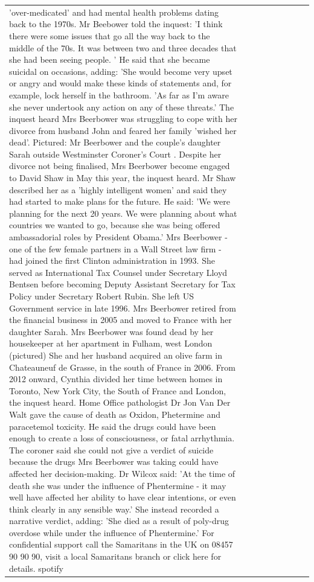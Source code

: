 \begin{table}[H]
\begin{tabular}{lllrlllll}
'over-medicated' and had mental health problems dating back to the 1970s. Mr Beebower told the inquest: 'I think there were some issues that go all the way back to the middle of the 70s. It was between two and three decades that she had been seeing people. ' He said that she became suicidal on occasions, adding: 'She would become very upset or angry and would make these kinds of statements and, for example, lock herself in the bathroom. 'As far as I'm aware she never undertook any action on any of these threats.' The inquest heard Mrs Beerbower was struggling to cope with her divorce from husband John and feared her family 'wished her dead'. Pictured: Mr Beerbower and the couple's daughter Sarah outside Westminster Coroner's Court . Despite her divorce not being finalised, Mrs Beerbower become engaged to David Shaw in May this year, the inquest heard. Mr Shaw described her as a 'highly intelligent women' and said they had started to make plans for the future. He said: 'We were planning for the next 20 years. We were planning about what countries we wanted to go, because she was being offered ambassadorial roles by President Obama.' Mrs Beerbower - one of the few female partners in a Wall Street law firm - had joined the first Clinton administration in 1993. She served as International Tax Counsel under Secretary Lloyd Bentsen before becoming Deputy Assistant Secretary for Tax Policy under Secretary Robert Rubin. She left US Government service in late 1996. Mrs Beerbower retired from the financial business in 2005 and moved to France with her daughter Sarah. Mrs Beerbower was found dead by her housekeeper at her apartment in Fulham, west London (pictured) She and her husband acquired an olive farm in Chateauneuf de Grasse, in the south of France in 2006. From 2012 onward, Cynthia divided her time between homes in Toronto, New York City, the South of France and London, the inquest heard. Home Office pathologist Dr Jon Van Der Walt gave the cause of death as Oxidon, Phetermine and paracetemol toxicity. He said the drugs could have been enough to create a loss of consciousness, or fatal arrhythmia. The coroner said she could not give a verdict of suicide because the drugs Mrs Beerbower was taking could have affected her decision-making. Dr Wilcox said: 'At the time of death she was under the influence of Phentermine - it may well have affected her ability to have clear intentions, or even think clearly in any sensible way.' She instead recorded a narrative verdict, adding: 'She died as a result of poly-drug overdose while under the influence of Phentermine.' For confidential support call the Samaritans in the UK on 08457 90 90 90, visit a local Samaritans branch or click here for details. spotify \\

\end{tabular}
\end{table}
